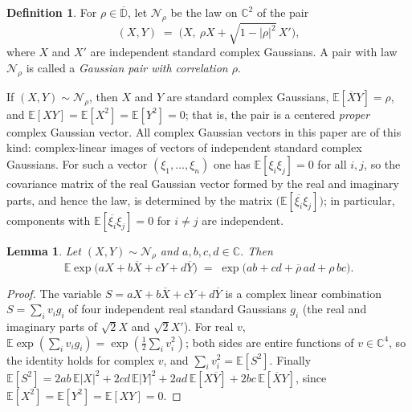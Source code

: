\documentclass[11pt,reqno]{amsart}
\newtheorem{lemma}[theorem]{Lemma}
\theoremstyle{definition}
\newtheorem{definition}[theorem]{Definition}
\numberwithin{equation}{section}
\newcommand{\C}{\mathbb{C}}
\newcommand{\D}{\mathbb{D}}
\newcommand{\E}{\mathbb{E}}
\begin{document}
\begin{definition}\label{def:pair}
For $\rho\in\overline{\D}$, let $\mathcal{N}_\rho$ be the law on $\C^2$ of the pair
\[
  (X,Y) \;=\; \bigl(X,\ \rho X+\sqrt{1-|\rho|^2}\,X'\bigr),
\]
where $X$ and $X'$ are independent standard complex Gaussians. A pair with law $\mathcal{N}_\rho$ is called a \emph{Gaussian pair with correlation $\rho$}.
\end{definition}

If $(X,Y)\sim\mathcal{N}_\rho$, then $X$ and $Y$ are standard complex Gaussians, $\E[\overline{X}Y]=\rho$, and $\E[XY]=\E[X^2]=\E[Y^2]=0$; that is, the pair is a centered \emph{proper} complex Gaussian vector. All complex Gaussian vectors in this paper are of this kind: complex-linear images of vectors of independent standard complex Gaussians. For such a vector $(\xi_1,\dots,\xi_n)$ one has $\E[\xi_i\xi_j]=0$ for all $i,j$, so the covariance matrix of the real Gaussian vector formed by the real and imaginary parts, and hence the law, is determined by the matrix $\bigl(\E[\overline{\xi_i}\xi_j]\bigr)$; in particular, components with $\E[\overline{\xi_i}\xi_j]=0$ for $i\ne j$ are independent.

\begin{lemma}\label{lem:expmoment}
Let $(X,Y)\sim\mathcal{N}_\rho$ and $a,b,c,d\in\C$. Then
\[
  \E\exp\bigl(aX+b\overline{X}+cY+d\overline{Y}\bigr) \;=\; \exp\bigl(ab+cd+\overline{\rho}\,ad+\rho\,bc\bigr).
\]
\end{lemma}

\begin{proof}
The variable $S=aX+b\overline{X}+cY+d\overline{Y}$ is a complex linear combination $S=\sum_i v_ig_i$ of four independent real standard Gaussians $g_i$ (the real and imaginary parts of $\sqrt2X$ and $\sqrt2X'$). For real $v$, $\E\exp(\sum_i v_ig_i)=\exp(\frac12\sum_i v_i^2)$; both sides are entire functions of $v\in\C^4$, so the identity holds for complex $v$, and $\sum_i v_i^2=\E[S^2]$. Finally $\E[S^2]=2ab\,\E|X|^2+2cd\,\E|Y|^2+2ad\,\E[X\overline{Y}]+2bc\,\E[\overline{X}Y]$, since $\E[X^2]=\E[Y^2]=\E[XY]=0$.
\end{proof}
\end{document}
